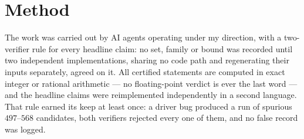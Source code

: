\documentclass[10pt,a4paper]{article}
\begin{document}
\section{Method}

The work was carried out by AI agents operating under my direction, with a two-verifier rule for
every headline claim: no set, family or bound was recorded until two independent implementations,
sharing no code path and regenerating their inputs separately, agreed on it. All certified
statements are computed in exact integer or rational arithmetic --- no floating-point verdict is
ever the last word --- and the headline claims were reimplemented independently in a second
language. That rule earned its keep at least once: a driver bug produced a run of spurious
$497$--$568$ candidates, both verifiers rejected every one of them, and no false record was
logged.
\end{document}
